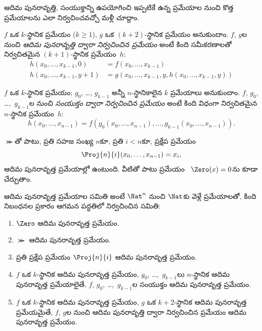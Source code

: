 \documentclass[../../../include/open-logic-section]{subfiles}
\begin{document}

ఆదిమ పునరావృత్తి, సంయుక్తాన్ని ఉపయోగించి ఇప్పటికే ఉన్న ప్రమేయాల నుంచి
కొత్త ప్రమేయాలను ఎలా నిర్వచించవచ్చో మళ్లీ చూద్దాం.

\begin{defn}
   $f$ ఒక $k$-స్థానిక ప్రమేయం
  ($k\ge 1$), $g$ ఒక $(k+2)$-స్థానిక ప్రమేయం అనుకుందాం. $f$, $g$ల
  నుంచి \emph{ఆదిమ పునరావృత్తి ద్వారా నిర్వచించిన ప్రమేయం} అంటే కింది
  సమీకరణాలతో నిర్వచితమైన $(k+1)$-స్థానిక ప్రమేయం~$h$:
  \begin{align*}
    h(x_0,\dots,x_{k-1},0) & =  f(x_0,\dots,x_{k-1}) \\
    h(x_0,\dots,x_{k-1},y+1) & = g(x_0,\dots,x_{k-1}, y, h(x_0,\dots,x_{k-1}, y))
  \end{align*}
\end{defn}

\begin{defn}
   $f$ ఒక $k$-స్థానిక ప్రమేయం; $g_0$,
  \dots, $g_{k-1}$ అన్నీ $n$-స్థానికాలైన $k$ ప్రమేయాలు అనుకుందాం.
  $f$, $g_0$, \dots,~$g_{k-1}$ల నుంచి \emph{సంయుక్తం ద్వారా
  నిర్వచించిన ప్రమేయం} అంటే కింది విధంగా నిర్వచితమైన $n$-స్థానిక
  ప్రమేయం~$h$:
  \[
  h(x_0, \dots, x_{n-1}) =
  f(g_0(x_0, \dots, x_{n-1}), \dots, g_{k-1}(x_0, \dots, x_{n-1})).
  \]
\end{defn}

$\Succ$తో పాటు, ప్రతి సహజ సంఖ్య $n$కూ, ప్రతి $i<n$కూ, ప్రక్షేప ప్రమేయం
\[
\Proj{n}{i}(x_0,\dots,x_{n-1}) = x_i,
\]
ఆదిమ పునరావృత్త ప్రమేయాల్లో ఉంటుంది. వీటితో పాటు ప్రమేయం
~$\Zero(x)=0$ను కూడా చేర్చుతాం.

\begin{defn}
  ఆదిమ పునరావృత్త ప్రమేయాల సమితి అంటే $\Nat^n$ నుంచి $\Nat$కు
  వెళ్లే ప్రమేయాలతో, కింది నిబంధనల ప్రకారం ఆగమన పద్ధతిలో నిర్వచించిన సమితి:
  \begin{enumerate}
  \item $\Zero$ ఆదిమ పునరావృత్త ప్రమేయం.
  \item $\Succ$ ఆదిమ పునరావృత్త ప్రమేయం.
  \item ప్రతి ప్రక్షేప ప్రమేయం $\Proj{n}{i}$ ఆదిమ పునరావృత్త
    ప్రమేయం.
  \item $f$ ఒక $k$-స్థానిక ఆదిమ పునరావృత్త ప్రమేయం, $g_0$,
    \dots,~$g_{k-1}$లు $n$-స్థానిక ఆదిమ పునరావృత్త ప్రమేయాలైతే,
    $f$, $g_0$, \dots,~$g_{k-1}$ల సంయుక్తం ఆదిమ
    పునరావృత్త ప్రమేయం.
  \item $f$ ఒక $k$-స్థానిక ఆదిమ పునరావృత్త ప్రమేయం, $g$ ఒక
    $k+2$-స్థానిక ఆదిమ పునరావృత్త ప్రమేయమైతే, $f$, $g$ల నుంచి ఆదిమ
    పునరావృత్తి ద్వారా నిర్వచించిన ప్రమేయం ఆదిమ పునరావృత్త ప్రమేయం.
\end{enumerate}
\end{defn}
\end{document}
